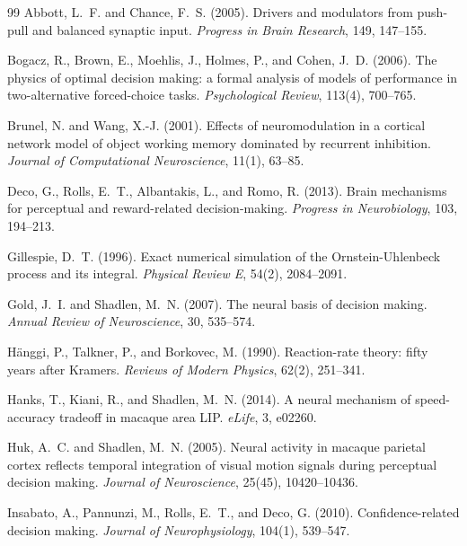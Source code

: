 \documentclass[11pt]{article}
\begin{document}
	\begin{thebibliography}{99}
		Abbott, L.~F. and Chance, F.~S. (2005).
		Drivers and modulators from push-pull and balanced synaptic input.
		\textit{Progress in Brain Research}, 149, 147--155.
		
		Bogacz, R., Brown, E., Moehlis, J., Holmes, P., and Cohen, J.~D. (2006).
		The physics of optimal decision making: a formal analysis of models of performance in two-alternative forced-choice tasks.
		\textit{Psychological Review}, 113(4), 700--765.
		
		Brunel, N. and Wang, X.-J. (2001).
		Effects of neuromodulation in a cortical network model of object working memory dominated by recurrent inhibition.
		\textit{Journal of Computational Neuroscience}, 11(1), 63--85.
		
		Deco, G., Rolls, E.~T., Albantakis, L., and Romo, R. (2013).
		Brain mechanisms for perceptual and reward-related decision-making.
		\textit{Progress in Neurobiology}, 103, 194--213.
		
		Gillespie, D.~T. (1996).
		Exact numerical simulation of the Ornstein-Uhlenbeck process and its integral.
		\textit{Physical Review E}, 54(2), 2084--2091.
		
		Gold, J.~I. and Shadlen, M.~N. (2007).
		The neural basis of decision making.
		\textit{Annual Review of Neuroscience}, 30, 535--574.
		
		H{\"a}nggi, P., Talkner, P., and Borkovec, M. (1990).
		Reaction-rate theory: fifty years after Kramers.
		\textit{Reviews of Modern Physics}, 62(2), 251--341.
		
		Hanks, T., Kiani, R., and Shadlen, M.~N. (2014).
		A neural mechanism of speed-accuracy tradeoff in macaque area LIP.
		\textit{eLife}, 3, e02260.
		
		Huk, A.~C. and Shadlen, M.~N. (2005).
		Neural activity in macaque parietal cortex reflects temporal integration of visual motion signals during perceptual decision making.
		\textit{Journal of Neuroscience}, 25(45), 10420--10436.
		
		Insabato, A., Pannunzi, M., Rolls, E.~T., and Deco, G. (2010).
		Confidence-related decision making.
		\textit{Journal of Neurophysiology}, 104(1), 539--547.
		

\end{thebibliography}
\end{document}
